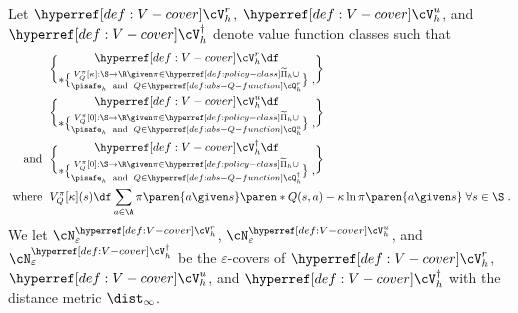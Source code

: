 \begin{definition}\label{def:V-cover}
Let $\cVr_h$, $\cVu_h$, and $\cVc_h$ denote value function classes such that
\begin{align*}
&\cVr_h\df \brace*{V^\pi_Q[\kappa]: \S \to \R \given 
\pi \in \tiPi_h \cup \brace{\pisafe_h}\;
\text{ and }\; Q \in \cQr_h
}\;,\\
&\cVu_h\df \brace*{V^\pi_Q[0]: \S \to \R \given 
\pi \in \tiPi_h \cup \brace{\pisafe_h}\;
\text{ and }\; Q \in \cQu_h
}\;,\\
\text{ and }\;
&\cVc_h\df \brace*{V^\pi_Q[0]: \S \to \R \given 
\pi \in \tiPi_h \cup \brace{\pisafe_h}\;
\text{ and }\; Q \in \cQc_h
}\;,\\
\text{ where }\;
&V^\pi_Q[\kappa](s) \df \sum_{a \in \A} \pi\paren{a \given s}\paren*{Q(s, a) - \kappa \ln \pi\paren{a \given s}}\; \forall s \in \S \;.
\end{align*}
We let $\cN^{\cVr_h}_{\varepsilon}$, $\cN^{\cVu_h}_{\varepsilon}$, and $\cN^{\cVc_h}_{\varepsilon}$ be the $\varepsilon$-covers of $\cVr_h$, $\cVu_h$, and $\cVc_h$ with the distance metric $\dist_\infty$.
\end{definition}

